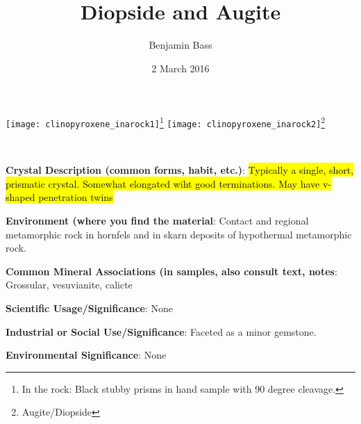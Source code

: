 \documentclass[10pt]{article}
\author{Benjamin Bass}
\date{2 March 2016}
\title{\vspace{-2.0cm}Diopside and Augite} %
\begin{document}
\maketitle


\begin{center}
  \texttt{[image: clinopyroxene\_inarock1]}\footnote{In the rock: Black stubby prisms in hand sample with 90 degree cleavage.}
  \texttt{[image: clinopyroxene\_inarock2]}\footnote{Augite/Diopside}
\end{center}

\
\
\
\
\
\
\
\
\
\

\begin{framed}
  \textbf{Crystal Description (common forms, habit, etc.)}: \hl{Typically a single, short, prismatic crystal. Somewhat elongated wiht good terminations. May have v-shaped penetration twins}
\end{framed}

\begin{framed}
  \textbf{Environment (where you find the material}: Contact and regional metamorphic rock in hornfels and in skarn deposits of hypothermal metamorphic rock.
\end{framed}

\begin{framed}
  \textbf{Common Mineral Associations (in samples, also consult text, notes}: Grossular, vesuvianite, calicte
\end{framed}

\begin{framed}
  \textbf{Scientific Usage/Significance}: None
\end{framed}

\begin{framed}
  \textbf{Industrial or Social Use/Significance}: Faceted as a minor gemstone.
\end{framed}

\begin{framed}
  \textbf{Environmental Significance}: None
\end{framed}

\end{document}
